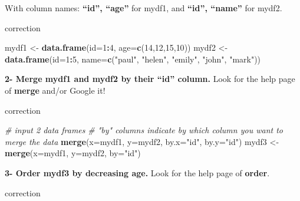 \documentclass[]{book}
\newenvironment{Shaded}{\begin{snugshade}}{\end{snugshade}}
\newcommand{\CommentTok}[1]{\textcolor[rgb]{0.56,0.35,0.01}{\textit{#1}}}
\newcommand{\DataTypeTok}[1]{\textcolor[rgb]{0.13,0.29,0.53}{#1}}
\newcommand{\DecValTok}[1]{\textcolor[rgb]{0.00,0.00,0.81}{#1}}
\newcommand{\KeywordTok}[1]{\textcolor[rgb]{0.13,0.29,0.53}{\textbf{#1}}}
\newcommand{\NormalTok}[1]{#1}
\newcommand{\OperatorTok}[1]{\textcolor[rgb]{0.81,0.36,0.00}{\textbf{#1}}}
\newcommand{\OtherTok}[1]{\textcolor[rgb]{0.56,0.35,0.01}{#1}}
\newcommand{\StringTok}[1]{\textcolor[rgb]{0.31,0.60,0.02}{#1}}
\begin{document}
With column names: \textbf{``id'', ``age''} for mydf1, and \textbf{``id'', ``name''} for mydf2.

correction

\begin{Shaded}
\begin{Highlighting}[]
\NormalTok{mydf1 <-}\StringTok{ }\KeywordTok{data.frame}\NormalTok{(}\DataTypeTok{id=}\DecValTok{1}\OperatorTok{:}\DecValTok{4}\NormalTok{, }\DataTypeTok{age=}\KeywordTok{c}\NormalTok{(}\DecValTok{14}\NormalTok{,}\DecValTok{12}\NormalTok{,}\DecValTok{15}\NormalTok{,}\DecValTok{10}\NormalTok{))}
\NormalTok{mydf2 <-}\StringTok{ }\KeywordTok{data.frame}\NormalTok{(}\DataTypeTok{id=}\DecValTok{1}\OperatorTok{:}\DecValTok{5}\NormalTok{, }\DataTypeTok{name=}\KeywordTok{c}\NormalTok{(}\StringTok{"paul"}\NormalTok{, }\StringTok{"helen"}\NormalTok{, }\StringTok{"emily"}\NormalTok{, }\StringTok{"john"}\NormalTok{, }\StringTok{"mark"}\NormalTok{))}
\end{Highlighting}
\end{Shaded}

\textbf{2- Merge mydf1 and mydf2 by their ``id'' column.}
Look for the help page of \textbf{merge} and/or Google it!

correction

\begin{Shaded}
\begin{Highlighting}[]
\CommentTok{# input 2 data frames}
\CommentTok{# "by" columns indicate by which column you want to merge the data}
\KeywordTok{merge}\NormalTok{(}\DataTypeTok{x=}\NormalTok{mydf1, }\DataTypeTok{y=}\NormalTok{mydf2, }\DataTypeTok{by.x=}\StringTok{"id"}\NormalTok{, }\DataTypeTok{by.y=}\StringTok{"id"}\NormalTok{)}
\NormalTok{mydf3 <-}\StringTok{ }\KeywordTok{merge}\NormalTok{(}\DataTypeTok{x=}\NormalTok{mydf1, }\DataTypeTok{y=}\NormalTok{mydf2, }\DataTypeTok{by=}\StringTok{"id"}\NormalTok{)}
\end{Highlighting}
\end{Shaded}

\textbf{3- Order mydf3 by decreasing age.}
Look for the help page of \textbf{order}.

correction

\begin{Shaded}
\end{Shaded}
\end{document}
